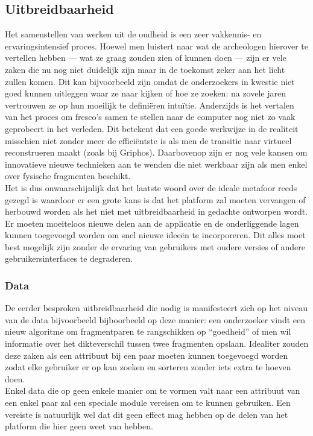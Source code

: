 \subsection{Uitbreidbaarheid}
Het samenstellen van werken uit de oudheid is een zeer vakkennis- en ervaringsintensief proces. Hoewel men luistert naar wat de archeologen hierover te vertellen hebben --- wat ze graag zouden zien of kunnen doen --- zijn er vele zaken die nu nog niet duidelijk zijn maar in de toekomst zeker aan het licht zullen komen. Dit kan bijvoorbeeld zijn omdat de onderzoekers in kwestie niet goed kunnen uitleggen waar ze naar kijken of hoe ze zoeken: na zovele jaren vertrouwen ze op hun moeilijk te defini\"eren intu\"itie. Anderzijds is het vertalen van het proces om fresco's samen te stellen naar de computer nog niet zo vaak geprobeert in het verleden. Dit betekent dat een goede werkwijze in de realiteit misschien niet zonder meer de effici\"entste is als men de transitie naar virtueel reconstrueren maakt (zoals bij Griphos). Daarbovenop zijn er nog vele kansen om innovatieve nieuwe technieken aan te wenden die niet werkbaar zijn als men enkel over fysische fragmenten beschikt.\\

Het is dus onwaarschijnlijk dat het laatste woord over de ideale metafoor reeds gezegd is waardoor er een grote kans is dat het platform zal moeten vervangen of herbouwd worden als het niet met uitbreidbaarheid in gedachte ontworpen wordt. Er moeten moeiteloos nieuwe delen aan de applicatie en de onderliggende lagen kunnen toegevoegd worden om snel nieuwe idee\"en te incorporeren. Dit alles moet best mogelijk zijn zonder de ervaring van gebruikers met oudere versies of andere gebruikersinterfaces te degraderen.

\subsubsection{Data}
De eerder besproken uitbreidbaarheid die nodig is manifesteert zich op het niveau van de data bijvoorbeeld bijboorbeeld op deze manier: een onderzoeker vindt een nieuw algoritme om fragmentparen te rangschikken op ``goedheid'' of men wil informatie over het dikteverschil tussen twee fragmenten opslaan. Idealiter zouden deze zaken als een attribuut bij een paar moeten kunnen toegevoegd worden zodat elke gebruiker er op kan zoeken en sorteren zonder iets extra te hoeven doen.\\
 
Enkel data die op geen enkele manier om te vormen valt naar een attribuut van een enkel paar zal een speciale module vereisen om te kunnen gebruiken. Een vereiste is natuurlijk wel dat dit geen effect mag hebben op de delen van het platform die hier geen weet van hebben.
 
